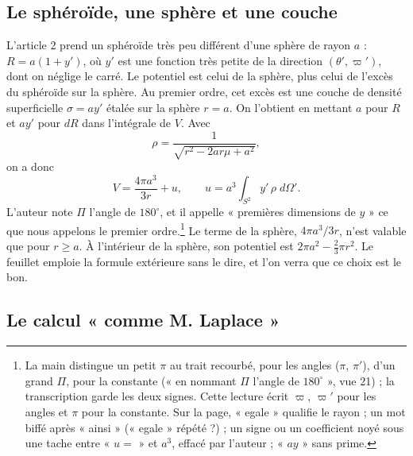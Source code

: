 \documentclass[11pt,a4paper]{article}
\begin{document}
\subsection*{Le sphéroïde, une sphère et une couche}

L'article 2 prend un sphéroïde très peu différent d'une sphère de rayon \(a\) :
\(R=a(1+y')\), où \(y'\) est une fonction très petite de la direction
\((\theta',\varpi')\), dont on néglige le carré. Le potentiel est celui de la
sphère, plus celui de l'excès du sphéroïde sur la sphère. Au premier ordre,
cet excès est une couche de densité superficielle \(\sigma=ay'\) étalée sur la
sphère \(r=a\). On l'obtient en mettant \(a\) pour \(R\) et \(ay'\) pour \(dR\)
dans l'intégrale de \(V\). Avec
\[
\rho=\frac{1}{\sqrt{r^2-2ar\mu+a^2}},
\]
on a donc
\[
V=\frac{4\pi a^3}{3r}+u,\qquad u=a^3\int_{S^2}y'\,\rho\;d\Omega'.
\]
L'auteur note \(\Pi\) l'angle de \(180^\circ\), et il appelle « premières
dimensions de \(y\) » ce que nous appelons le premier ordre.\footnote{La main
distingue un petit \(\pi\) au trait recourbé, pour les angles (\(\pi\),
\(\pi'\)), d'un grand \(\Pi\), pour la constante (« en nommant \(\Pi\)
l'angle de \(180^\circ\) », vue 21) ; la transcription garde les deux signes.
Cette lecture écrit \(\varpi\), \(\varpi'\) pour les angles et \(\pi\) pour
la constante. Sur la page, « egale »
qualifie le rayon ; un mot biffé après « ainsi » (« egale » répété ?) ; un
signe ou un coefficient noyé sous une tache entre « \(u=\) » et \(a^3\), effacé
par l'auteur ; « \(ay\) » sans prime.} Le terme de la sphère,
\(4\pi a^3/3r\), n'est valable que pour \(r\ge a\). À l'intérieur de la sphère,
son potentiel est \(2\pi a^2-\frac23\pi r^2\). Le feuillet emploie la formule
extérieure sans le dire, et l'on verra que ce choix est le bon.

\subsection*{Le calcul « comme M. Laplace »}
\end{document}
